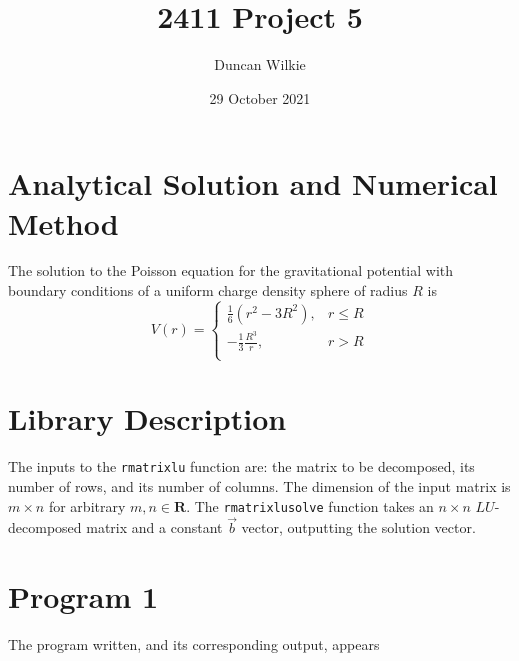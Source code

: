 \documentclass{article}
\title{2411 Project 5}
\author{Duncan Wilkie}
\date{29 October 2021}
\begin{document}
\maketitle

\section{Analytical Solution and Numerical Method}
The solution to the Poisson equation for the gravitational potential with boundary conditions of a uniform charge density sphere of radius $R$ is
\[V(r)=
  \begin{cases}
    \frac{1}{6}(r^2-3R^2), & r \leq R \\
    -\frac{1}{3}\frac{R^3}{r}, & r > R \\
  \end{cases}\]

\section{Library Description}
The inputs to the \verb|rmatrixlu| function are: the matrix to be decomposed, its number of rows, and its number of columns. The dimension of the input matrix is $m\times n$ for arbitrary $m,n\in\mathbf{R}$. The \verb|rmatrixlusolve| function takes an $n\times n$ $LU$-decomposed matrix and a constant $\vec{b}$ vector, outputting the solution vector.

\section{Program 1}
The program written, and its corresponding output, appears 
\end{document}
